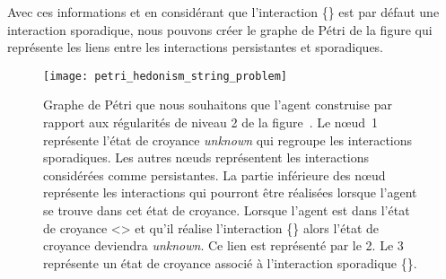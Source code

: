 \documentclass{llncs}
\begin{document}
Avec ces informations et en considérant que l'interaction \{\rondBlanc\} est par défaut une interaction sporadique, nous pouvons créer le graphe de Pétri de la figure  qui représente les liens entre les interactions persistantes et sporadiques. 
\begin{figure}
	\centering
	\texttt{[image: petri\_hedonism\_string\_problem]}
	\caption{Graphe de Pétri que nous souhaitons que l'agent construise par rapport aux régularités de niveau 2 de la figure~. Le nœud~\num{1} représente l'état de croyance \emph{unknown} qui regroupe les interactions sporadiques. Les autres nœuds représentent les interactions considérées comme persistantes. La partie inférieure des nœud représente les interactions qui pourront être réalisées lorsque l'agent se trouve dans cet état de croyance. Lorsque l'agent est dans l'état de croyance <\carreBlanc> et qu'il réalise l'interaction \{\triangleBlanc\} alors l'état de croyance deviendra \emph{unknown}. Ce lien est représenté par le \num{2}. Le \num{3} représente un état de croyance associé à l'interaction sporadique \{\rondBleu\}. }
	\label{fig:petri_hedonism_string_problem}
\end{figure}

\end{document}
